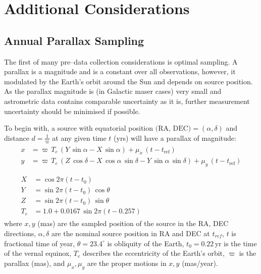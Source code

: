 \section{Additional Considerations} \label{sec:parallaxcalibration}
	\subsection{Annual Parallax Sampling}
		The first of many pre--data collection considerations is optimal sampling. A parallax is a magnitude and is a constant over all observations, however, it modulated by the Earth's orbit around the Sun and depends on source position. As the parallax magnitude is (in Galactic maser cases) very small and astrometric data contains comparable uncertainty as it is, further measurement uncertainty should be minimised if possible. %
		
		To begin with, a source with equatorial position $\text{(RA, DEC)}=\left(\alpha, \delta\right)$ and distance $d=\frac{1}{\varpi}$ at any given time $t$ (yrs) will have a parallax of magnitude:
        \begin{equation}
        	\begin{split}
        	\begin{split}   
        		x&=\varpi\,T_e\,\left(Y\,\sin\alpha-X\,\sin\alpha\right) + \mu_x\,(t-t_\text{ref})\\
        		y&=\varpi\,T_e\,\left(Z\,\cos\delta-X\,\cos\alpha\,\sin\delta-Y\,\sin\alpha\,\sin\delta\right) + \mu_y\,(t-t_\text{ref})
        	\end{split}\\ \\
        	\begin{split}
        		X &= \cos 2\pi(t-t_0) \\
        		Y &= \sin 2\pi(t-t_0)\,\cos\theta \\
        		Z &= \sin 2\pi(t-t_0)\,\sin\theta \\
        		T_e &= 1.0+0.0167\,\sin 2\pi\left(t-0.257\right)     	
        	\end{split}
        	\end{split}
      		\label{eq:parrequation}
        \end{equation}
		where $x,y$ (mas) are the sampled position of the source in the RA, DEC directions, $\alpha,\delta$ are the nominal source position in RA and DEC at $t_{ref}$, $t$ is fractional time of year, $\theta=23.4^\circ$ is obliquity of the Earth, $t_0=0.22$\,yr is the time of the vernal equinox, $T_e$ describes the eccentricity of the Earth's orbit, $\varpi$ is the parallax (mas), and $\mu_x,\mu_y$ are the proper motions in $x,y$ (mas/year).
		
